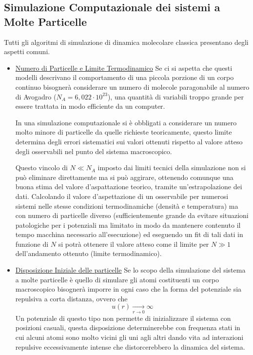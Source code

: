 \documentclass[11pt]{article}
\theoremstyle{plain}
\theoremstyle{remark}
\begin{document}
\subsection{Simulazione Computazionale dei sistemi a Molte Particelle}\label{cap: Simulazione in Generale}
Tutti gli algoritmi di simulazione di dinamica molecolare classica presentano degli aspetti comuni.
\begin{itemize}


\item \underline{Numero di Particelle e Limite Termodinamico}\newline
Se ci si aspetta che questi modelli descrivano il comportamento di una piccola porzione di un corpo continuo bisognerà considerare un numero di molecole paragonabile al numero di Avogadro ($N_A = 6,022 \cdot 10^23$), una quantità di variabili troppo grande per essere trattata in modo efficiente da un computer.

In una simulazione computazionale si è obbligati a considerare un numero molto minore di particelle da quelle richieste teoricamente, questo limite determina degli errori sistematici sui valori ottenuti rispetto al valore atteso degli osservabili nel punto del sistema macroscopico.

Questo vincolo di $N\ll N_A$ imposto dai limiti tecnici della simulazione non si può eliminare direttamente ma si può aggirare, ottenendo comunque una buona stima del valore d'aspattazione teorico, tramite un'estrapolazione dei dati.
\newline
Calcolando il valore d'aspettazione di un osservabile per numerosi sistemi nelle stesse condizioni termodinamiche (densità e temperatura) ma con numero di particelle diverso (sufficientemente grande da evitare situazioni patologiche per i potenziali ma limitato in modo da mantenere contenuto il tempo macchina necessario all'esecuzione) ed eseguendo un fit di tali dati in funzione di $N$ si potrà ottenere il valore atteso come il limite per $N\gg 1$ dell'andamento ottenuto (limite termodinamico).


\item \underline{Disposizione Iniziale delle particelle}\newline
Se lo scopo della simulazione del sistema a molte particelle è quello di simulare gli atomi costituenti un corpo macroscopico bisognerà imporre in ogni caso che la forma del potenziale sia repulsiva a corta distanza, ovvero che
\begin{displaymath}
u(r) \xrightarrow[r \rightarrow 0]{} \infty
\end{displaymath}
Un potenziale di questo tipo non permette di inizializzare il sistema con posizioni casuali, questa disposizione determinerebbe con frequenza stati in cui alcuni atomi sono molto vicini gli uni agli altri dando vita ad interazioni repulsive eccessivamente intense che distorcerebbero la dinamica del sistema.


\end{itemize}
\end{document}
